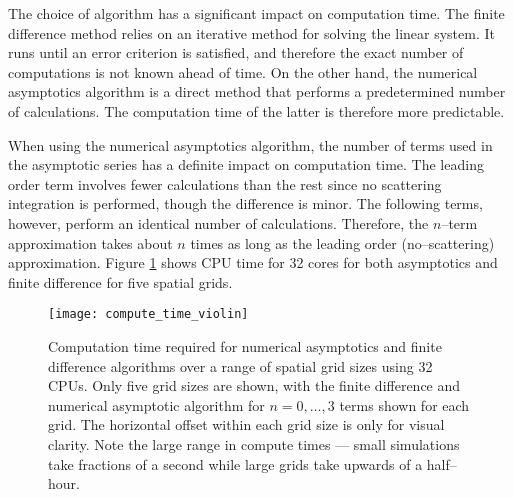 The choice of algorithm has a significant impact on computation time.
The finite difference method relies on an iterative method for solving the linear system.
It runs until an error criterion is satisfied, and therefore the exact number of computations is not known ahead of time.
On the other hand, the numerical asymptotics algorithm is a direct method that performs a predetermined number of calculations.
The computation time of the latter is therefore more predictable.

When using the numerical asymptotics algorithm, the number of terms used in the asymptotic series has a definite impact on computation time.
The leading order term involves fewer calculations than the rest since no scattering integration is performed, though the difference is minor.
The following terms, however, perform an identical number of calculations.
Therefore, the $n$--term approximation takes about $n$ times as long as the leading order (no--scattering) approximation.
Figure \ref{fig:compute_time_violin} shows CPU time for 32 cores for both asymptotics and finite difference for five spatial grids.

\begin{figure}[H]
  \centering
  \texttt{[image: compute\_time\_violin]}
  \caption{Computation time required for numerical asymptotics and finite difference algorithms over a range of spatial grid sizes using 32 CPUs. Only five grid sizes are shown, with the finite difference and numerical asymptotic algorithm for $n=0,\ldots,3$ terms shown for each grid. The horizontal offset within each grid size is only for visual clarity. Note the large range in compute times --- small simulations take fractions of a second while large grids take upwards of a half--hour.}
  \label{fig:compute_time_violin}
\end{figure}


